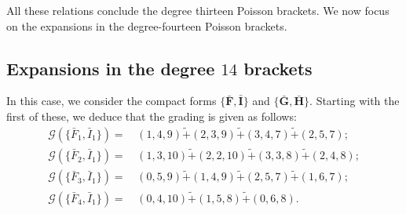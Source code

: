 \documentclass[10pt]{amsart}
\theoremstyle{definition}
\theoremstyle{corollary}
\theoremstyle{remark}
\theoremstyle{conclusion}
\begin{document}
All these relations conclude the degree thirteen Poisson brackets. We now focus on the expansions in the degree-fourteen Poisson brackets.

\subsection{Expansions in the degree $14$ brackets}

In this case, we consider the compact forms $\{\bar{\textbf{F}},\bar{\textbf{I}}\}$ and $\{\bar{\textbf{G}},\bar{\textbf{H}}\}.$ Starting with the first of these, we deduce that the grading is given as follows: 
\begin{align}
    \mathcal{G} \left(\{\bar{F}_1, \bar{I}_1\}\right)  = & \, (1,4,9) \tilde{+} (2,3,9)\tilde{+} (3,4,7)\tilde{+} (2,5,7); \nonumber \\
    \mathcal{G} \left(\{\bar{F}_2, \bar{I}_1\}\right)  = & \, (1,3,10) \tilde{+} (2,2,10)\tilde{+} (3,3,8)\tilde{+} (2,4,8); \nonumber \\
    \mathcal{G} \left(\{\bar{F}_3, \bar{I}_1\}\right)  = & \, (0,5,9) \tilde{+} (1,4,9)\tilde{+} (2,5,7)\tilde{+} (1,6,7); \nonumber \\
    \mathcal{G} \left(\{\bar{F}_4, \bar{I}_1\}\right)  = & \,  (0,4,10)\tilde{+} (1,5,8)\tilde{+} (0,6,8).
\end{align} 
\end{document}
